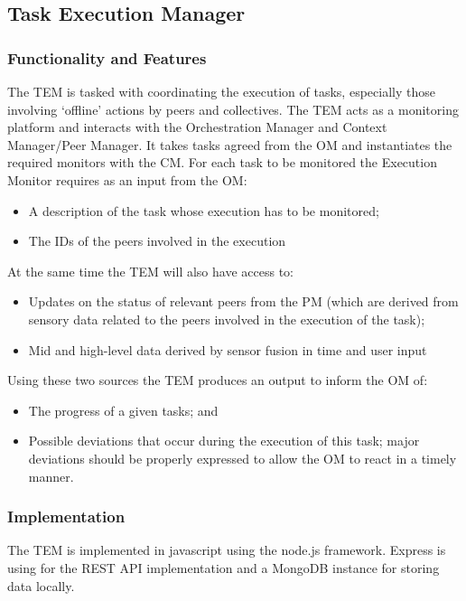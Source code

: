 \subsection{Task Execution Manager}
\subsubsection{Functionality and Features}
The TEM is tasked with coordinating the execution of tasks, especially those involving `offline' actions by peers and collectives. The TEM acts as a monitoring platform and interacts with the Orchestration Manager and Context Manager/Peer Manager. It takes tasks agreed from the OM and instantiates the required monitors with the CM.
For each task to be monitored the Execution Monitor requires as an input from the OM:
\begin{itemize} 
\item A description of the task whose execution has to be monitored; 
\item The IDs of the peers involved in the execution
\end{itemize}
At the same time the TEM will also have access to:
\begin{itemize}
\item Updates on the status of relevant peers from the PM (which are derived from sensory data related to the peers involved in the execution of the task);
\item Mid and high-level data derived by sensor fusion in time and user input
\end{itemize}
Using these two sources the TEM produces an output to inform the OM of:
\begin{itemize}
\item The progress of a given tasks; and
\item Possible deviations that occur during the execution of this task; major deviations should be properly expressed to allow the OM to react in a timely manner.
\end{itemize}
\subsubsection{Implementation}
The TEM is implemented in javascript using the node.js framework. Express is using for the REST API implementation and a MongoDB instance for storing data locally.

